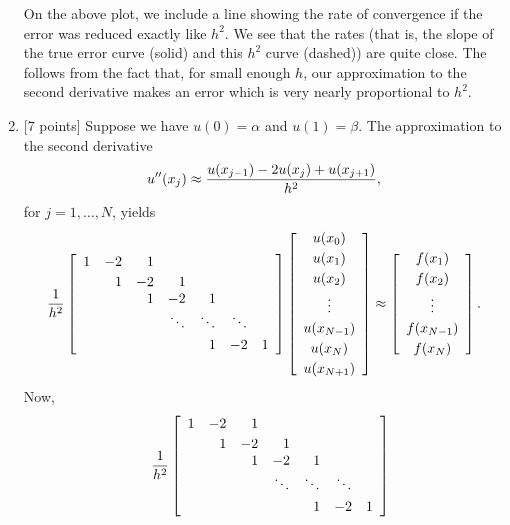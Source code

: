 \begin{solution}
\begin{enumerate}
On the above plot, we include a line showing the rate of convergence
if the error was reduced exactly like $h^2$.  We see that the rates
(that is, the slope of the true error curve (solid) and this $h^2$
curve (dashed)) are quite close.  The follows from the fact that, for small enough $h$,
our approximation to the second derivative makes an error which is very nearly proportional to $h^2$.
\\
\item {[7 points]} 
Suppose we have $u(0) = \alpha$ and $u(1) = \beta$. The approximation to the second derivative 
\[
u''(x_j)\approx{u(x_{j-1})-2u(x_j)+u(x_{j+1})\over h^2},
\]
for $j=1,\ldots,N$, yields
\[ {1\over h^2} \left[\begin{array}{rrrrrrr}
              1 & -2 & 1 \\[0.25em]
               & 1 & -2 & 1 \\
                & &  1  & -2 & 1 \\
                & & & \ddots & \ddots & \ddots \\[0.25em]
                 && & & 1 & -2 & 1
               \end{array}\right]
          \left[\begin{array}{c} u(x_0) \\[0.25em] u(x_1) \\[0.25em] u(x_2) \\[0.25em] \vdots \\[0.25em] u(x_{N-1}) \\[0.25em] u(x_N) \\[0.25em] u(x_{N+1}) \end{array}\right]
 \approx   \left[\begin{array}{c} f(x_1) \\[0.25em] f(x_2) \\[0.25em] \vdots \\[0.25em] f(x_{N-1}) \\[0.25em] f(x_N) \end{array}\right].\]
Now,
\begin{eqnarray*}
&&{1\over h^2} \left[\begin{array}{rrrrrrr}
              1 & -2 & 1 \\[0.25em]
               & 1 & -2 & 1 \\
                & &  1  & -2 & 1 \\
                & & & \ddots & \ddots & \ddots \\[0.25em]
                 && & & 1 & -2 & 1
               \end{array}\right]

\end{eqnarray*}
\end{enumerate}
\end{solution}
